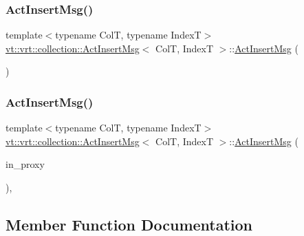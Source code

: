 \subsubsection{\texorpdfstring{Act\+Insert\+Msg()}{ActInsertMsg()}\hspace{0.1cm}{\footnotesize\ttfamily [1/2]}}
{\footnotesize\ttfamily template$<$typename ColT, typename IndexT$>$ \\
\hyperlink{structvt_1_1vrt_1_1collection_1_1_act_insert_msg}{vt\+::vrt\+::collection\+::\+Act\+Insert\+Msg}$<$ ColT, IndexT $>$\+::\hyperlink{structvt_1_1vrt_1_1collection_1_1_act_insert_msg}{Act\+Insert\+Msg} (\begin{DoxyParamCaption}{ }\end{DoxyParamCaption})\hspace{0.3cm}{\ttfamily [default]}}

\mbox{\label{structvt_1_1vrt_1_1collection_1_1_act_insert_msg_a26f5c8527a3fd30ece4ef661ebb41798}} 
\subsubsection{\texorpdfstring{Act\+Insert\+Msg()}{ActInsertMsg()}\hspace{0.1cm}{\footnotesize\ttfamily [2/2]}}
{\footnotesize\ttfamily template$<$typename ColT, typename IndexT$>$ \\
\hyperlink{structvt_1_1vrt_1_1collection_1_1_act_insert_msg}{vt\+::vrt\+::collection\+::\+Act\+Insert\+Msg}$<$ ColT, IndexT $>$\+::\hyperlink{structvt_1_1vrt_1_1collection_1_1_act_insert_msg}{Act\+Insert\+Msg} (\begin{DoxyParamCaption}\item[{\hyperlink{structvt_1_1vrt_1_1collection_1_1_collection_proxy}{Collection\+Proxy}$<$ ColT, IndexT $>$}]{in\+\_\+proxy }\end{DoxyParamCaption})\hspace{0.3cm}{\ttfamily [inline]}, {\ttfamily [explicit]}}



\subsection{Member Function Documentation}
\mbox{\label{structvt_1_1vrt_1_1collection_1_1_act_insert_msg_afd6395c664e7eac82e17834ed7af9ce7}} 
